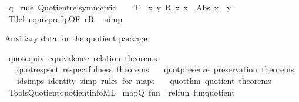 \begin{isabellebody}
\ q\ \isamarkupfalse%
{\isacharparenleft}{\kern0pt}rule\ Quotient{}{\isacharunderscore}{\kern0pt}rel{\isacharbrackleft}{\kern0pt}symmetric{\isacharbrackright}{\kern0pt}{\isacharparenright}{\kern0pt}\isanewline
{}\isamarkupfalse%
\isanewline
\ \ \isamarkupfalse%
\ {\isachardoublequoteopen}T\ {\isacharequal}{\kern0pt}\ {\isacharparenleft}{\kern0pt}{\isasymlambda}x\ y{\isachardot}{\kern0pt}\ R\ x\ x\ {\isasymand}\ Abs\ x\ {\isacharequal}{\kern0pt}\ y{\isacharparenright}{\kern0pt}{\isachardoublequoteclose}\ \isamarkupfalse%
\ T{\isacharunderscore}{\kern0pt}def\ equivp{\isacharunderscore}{\kern0pt}reflp{\isacharbrackleft}{\kern0pt}OF\ eR{\isacharbrackright}{\kern0pt}\ \isamarkupfalse%
\ simp\isanewline
{}\isamarkupfalse%
%
\endisatagproof
{\isafoldproof}%
%
\isadelimproof
%
\endisadelimproof
%
\isadelimdocument
%
\endisadelimdocument
%
\isatagdocument
%
\isamarkuptrue%
%
\endisatagdocument
{\isafolddocument}%
%
\isadelimdocument
%
\endisadelimdocument
%
\begin{isamarkuptext}%
Auxiliary data for the quotient package%
\end{isamarkuptext}\isamarkuptrue%
\isamarkupfalse%
\ quot{\isacharunderscore}{\kern0pt}equiv\ {\isachardoublequoteopen}equivalence\ relation\ theorems{\isachardoublequoteclose}\isanewline
\ \ \ quot{\isacharunderscore}{\kern0pt}respect\ {\isachardoublequoteopen}respectfulness\ theorems{\isachardoublequoteclose}\isanewline
\ \ \ quot{\isacharunderscore}{\kern0pt}preserve\ {\isachardoublequoteopen}preservation\ theorems{\isachardoublequoteclose}\isanewline
\ \ \ id{\isacharunderscore}{\kern0pt}simps\ {\isachardoublequoteopen}identity\ simp\ rules\ for\ maps{\isachardoublequoteclose}\isanewline
\ \ \ quot{\isacharunderscore}{\kern0pt}thm\ {\isachardoublequoteopen}quotient\ theorems{\isachardoublequoteclose}\isanewline
%
\isadelimML
%
\endisadelimML
%
\isatagML
{}\isamarkupfalse%
\ {\isacartoucheopen}Tools{\isacharslash}{\kern0pt}Quotient{\isacharslash}{\kern0pt}quotient{\isacharunderscore}{\kern0pt}info{\isachardot}{\kern0pt}ML{\isacartoucheclose}%
\endisatagML
{\isafoldML}%
%
\isadelimML
\isanewline
%
\endisadelimML
\isanewline
{}\isamarkupfalse%
\ {\isacharbrackleft}{\kern0pt}{\isacharbrackleft}{\kern0pt}mapQ{}\ {\isachardoublequoteopen}fun{\isachardoublequoteclose}\ {\isacharequal}{\kern0pt}\ {\isacharparenleft}{\kern0pt}rel{\isacharunderscore}{\kern0pt}fun{\isacharcomma}{\kern0pt}\ fun{\isacharunderscore}{\kern0pt}quotient{}{\isacharparenright}{\kern0pt}{\isacharbrackright}{\kern0pt}{\isacharbrackright}{\kern0pt}\isanewline

\end{isabellebody}
